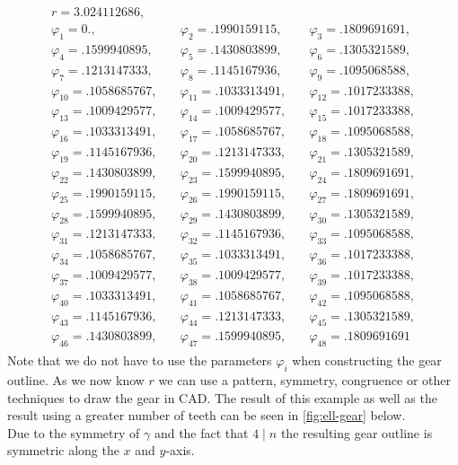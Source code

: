 \documentclass[12pt,a4paper]{scrartcl}
\numberwithin{equation}{section}
\numberwithin{myalgctr}{section}
\numberwithin{mytheoremctr}{section}
\numberwithin{myexamplectr}{subsection}
\begin{document}
	\begin{align*}
		\begin{array}{lll}
				r = 3.024112686,\quad &  & \\
				\varphi_{1} = 0.,\quad & \varphi_{2} = .1990159115,\quad & \varphi_{3} = .1809691691,\\
				\varphi_{4} = .1599940895,\quad & \varphi_{5} = .1430803899,\quad & \varphi_{6} = .1305321589,\\
				\varphi_{7} = .1213147333,\quad & \varphi_{8} = .1145167936,\quad & \varphi_{9} = .1095068588,\\
				\varphi_{10} = .1058685767,\quad & \varphi_{11} = .1033313491,\quad & \varphi_{12} = .1017233388,\\
				\varphi_{13} = .1009429577,\quad & \varphi_{14} = .1009429577,\quad & \varphi_{15} = .1017233388,\\
				\varphi_{16} = .1033313491,\quad & \varphi_{17} = .1058685767,\quad & \varphi_{18} = .1095068588,\\
				\varphi_{19} = .1145167936,\quad & \varphi_{20} = .1213147333,\quad & \varphi_{21} = .1305321589,\\
				\varphi_{22} = .1430803899,\quad & \varphi_{23} = .1599940895,\quad & \varphi_{24} = .1809691691,\\
				\varphi_{25} = .1990159115,\quad & \varphi_{26} = .1990159115,\quad & \varphi_{27} = .1809691691,\\
				\varphi_{28} = .1599940895,\quad & \varphi_{29} = .1430803899,\quad & \varphi_{30} = .1305321589,\\
				\varphi_{31} = .1213147333,\quad & \varphi_{32} = .1145167936,\quad & \varphi_{33} = .1095068588,\\
				\varphi_{34} = .1058685767,\quad & \varphi_{35} = .1033313491,\quad & \varphi_{36} = .1017233388,\\
				\varphi_{37} = .1009429577,\quad & \varphi_{38} = .1009429577,\quad & \varphi_{39} = .1017233388,\\
				\varphi_{40} = .1033313491,\quad & \varphi_{41} = .1058685767,\quad & \varphi_{42} = .1095068588,\\
				\varphi_{43} = .1145167936,\quad & \varphi_{44} = .1213147333,\quad & \varphi_{45} = .1305321589,\\ 
				\varphi_{46} = .1430803899,\quad & \varphi_{47} = .1599940895,\quad & \varphi_{48} = .1809691691
		\end{array}
	\end{align*}
	Note that we do not have to use the parameters $\varphi_i$ when constructing the gear outline. As we now know $r$ we can use a pattern, symmetry, congruence or other techniques to draw the gear in CAD. The result of this example as well as the result using a greater number of teeth can be seen in \cref{fig:ell-gear} below.\\
	Due to the symmetry of $\gamma$ and the fact that $4\mid n$ the resulting gear outline is symmetric along the $x$ and $y$-axis.
	
\end{document}
